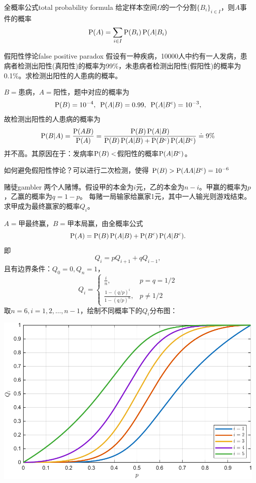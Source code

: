 \begin{theorem}{全概率公式}{total probability formula}
	给定样本空间$\Omega$的一个分割$\{B_i\}_{i\in I}$，则$A$事件的概率
	\begin{equation}
		\P(A)=\sum_{i\in I}\P(B_i)\P(A|B_i)
	\end{equation}
\end{theorem}
\begin{example}{假阳性悖论}{false positive paradox}
	假设有一种疾病，10000人中约有一人发病，患病者检测出阳性(真阳性)的概率为99\%，未患病者检测出阳性(假阳性)的概率为0.1\%。求检测出阳性的人患病的概率。

	$B=$患病，$A=$阳性，题中对应的概率为
	\[
		\P(B)=10^{-4},\enspace
		\P(A|B)=0.99,\enspace
		\P(A|B\c)=10^{-3},
	\]
	故检测出阳性的人患病的概率为
	\[
		\P(B|A)=\frac{\P(AB)}{\P(A)}=\frac{\P(B)\P(A|B)}{\P(B)\P(A|B)+\P(B\c)\P(A|B\c)}\doteq 9\%
	\]
	并不高。其原因在于：发病率$\P(B)<$假阳性的概率$\P(A|B\c)$。

	如何避免假阳性悖论？可以进行二次检测，使得
	$\P(B)>\P(AA|B\c)=10^{-6}$
	
\end{example}
\begin{example}{赌徒}{gambler}
	两个人赌博。假设甲的本金为$i$元，乙的本金为$n-i$。甲赢的概率为$p$，乙赢的概率为$q=1-p$。
	每赌一局输家给赢家1元，其中一人输光则游戏结束。求甲成为最终赢家的概率$Q_i$。

	$A=$甲最终赢，$B=$甲本局赢，由全概率公式
	\[
		\P(A)=\P(B)\P(A|B)+\P(B\c)\P(A|B\c).
	\]
	即
	\[
		Q_i=pQ_{i+1}+qQ_{i-1},%
	\]
	且有边界条件：$Q_0=0,Q_n=1$，
	\[
		Q_i=\begin{cases}
			\frac in,&p=q=1/2\\[2ex]
			\frac{1-(q/p)^i}{1-(q/p)^n},&p\neq 1/2
		\end{cases}
	\]
	取$n=6,i=1,2,\ldots,n-1$，绘制不同概率下的$Q_i$分布图：
	\begin{center}
		\includegraphics[width=0.7\linewidth]{figures/gamble.pdf}
	\end{center}
\end{example}


